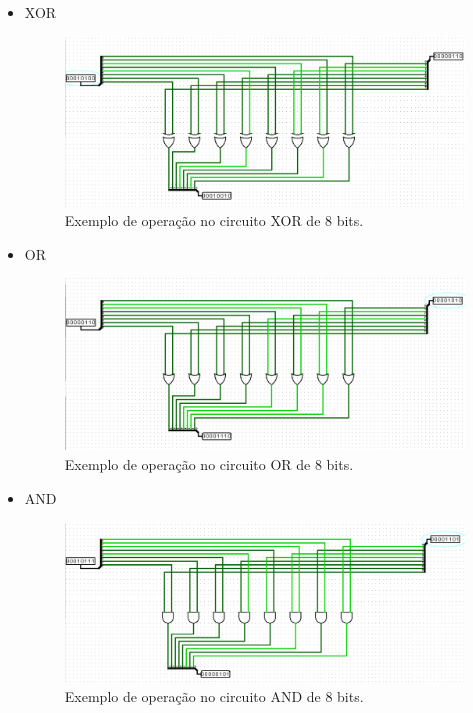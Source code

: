 \documentclass[
	12pt,				%
	openright,			%
	twoside,			%
	a4paper,			%
	english,			%
	french,				%
	spanish,			%
	brazil,				%
	]{abntex2}
\begin{document}
\begin{apendicesenv}
\begin{itemize}
\item {XOR}

\begin{figure}[H]
	\begin{center}
	    \includegraphics[scale=0.4]{xor8.png}
	\end{center}
\caption{\label{xorteste}Exemplo de operação no circuito XOR de 8 bits.}
\end{figure}

\item {OR}

\begin{figure}[H]
	\begin{center}
	    \includegraphics[scale=0.4]{or8.png}
	\end{center}
\caption{\label{orteste}Exemplo de operação no circuito OR de 8 bits.}
\end{figure}

\item {AND}

\begin{figure}[H]
	\begin{center}
	    \includegraphics[scale=0.4]{and8.png}
	\end{center}
\caption{\label{andteste}Exemplo de operação no circuito AND de 8 bits.}
\end{figure}


\end{itemize}
\end{apendicesenv}
\end{document}
